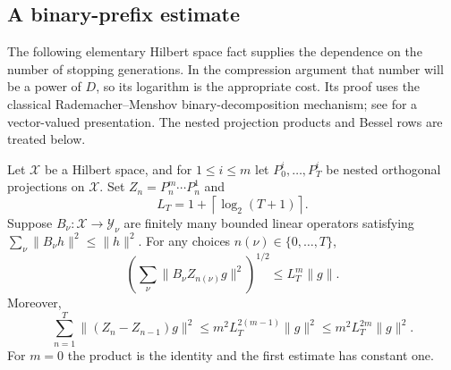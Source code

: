 \subsection{A binary-prefix estimate}

The following elementary Hilbert space fact supplies the dependence on the
number of stopping generations.  In the compression argument that number
will be a power of $D$, so its logarithm is the appropriate cost.
Its proof uses the classical Rademacher--Menshov binary-decomposition
mechanism; see \cite[Section~3, Lemma~1]{MM2011} for a vector-valued
presentation.  The nested projection products and Bessel rows are treated
below.

\begin{lemma}
\label{lem:projection-prefixes}
Let $\mathcal X$ be a Hilbert space, and for $1\le i\le m$ let
$P_0^i,\ldots,P_T^i$ be nested orthogonal projections on $\mathcal X$.
Set $Z_n=P_n^m\cdots P_n^1$ and
\[
 L_T=1+\left\lceil\log_2(T+1)\right\rceil.
\]
Suppose $B_\nu:\mathcal X\to\mathcal Y_\nu$ are finitely many bounded linear operators
satisfying $\sum_\nu\|B_\nu h\|^2\le\|h\|^2$.  For any choices
$n(\nu)\in\{0,\ldots,T\}$,
\[
 \left(\sum_\nu\|B_\nu Z_{n(\nu)}g\|^2\right)^{1/2}
       \le L_T^m\|g\|.
\]
Moreover,
\[
 \sum_{n=1}^T\|(Z_n-Z_{n-1})g\|^2
       \le m^2L_T^{2(m-1)}\|g\|^2
       \le m^2L_T^{2m}\|g\|^2.
\]
For $m=0$ the product is the identity and the first estimate has constant one.
\end{lemma}

